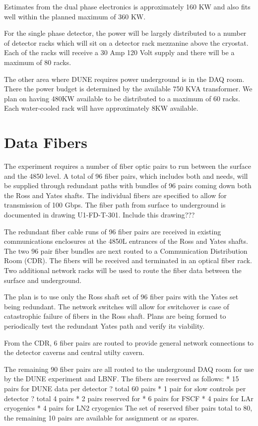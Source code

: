 Estimates from the dual phase electronics is approximately 160 KW and also fits well within the planned maximum of 360 KW.

For the single phase detector, the power will be largely distributed to a number of detector racks which will sit on a detector rack mezzanine above the cryostat.  Each of the racks will receive a 30 Amp 120 Volt supply and there will be a maximum of 80 racks.  

The other area where DUNE requires power underground is in the DAQ room.  There the power budget is determined by the available 750 KVA transformer.  We plan on having 480KW available to be distributed to a maximum of 60 racks.  Each water-cooled rack will have approximately 8KW available.  

\section{Data Fibers}
\label{sec:fdsp-coord-faci-fibers}


The  experiment requires a number of fiber 
optic pairs to run between the surface and the 4850 level.  A
total of 96 fiber pairs, which includes both  and 
needs, will be supplied through redundant paths with bundles of 96 pairs
coming down both the Ross and Yates shafts.  The individual fibers are specified to allow for transmission of 100 Gbps.  The fiber path from surface to underground is documented in drawing U1-FD-T-301.  Include this drawing???

The redundant fiber cable runs of 96 fiber pairs are received in existing communications enclosures at the 4850L entrances of the Ross and Yates shafts.  The two 96 pair fiber bundles are next routed to a Communication Distribution Room (CDR).  The fibers will be received and terminated in an optical fiber rack. Two additional network racks will be used to route the fiber data between the surface and underground.

The plan is to use only the Ross shaft set of 96 fiber pairs with the Yates set being redundant.  The network switches will allow for switchover is case of catastrophic failure of fibers in the Ross shaft.  Plans are being formed to periodically test the redundant Yates path and verify its viability.

From the CDR, 6 fiber pairs are routed to provide general network connections to the detector caverns and central utilty cavern.

The remaining 90 fiber pairs are all routed to the underground DAQ room for use by the DUNE experiment and LBNF. The fibers are reserved as follows:
* 15 pairs for DUNE data per detector ? total 60 pairs
* 1 pair for slow controls per detector ? total 4 pairs
* 2 pairs reserved for 
* 6 pairs for FSCF
* 4 pairs for LAr cryogenics
* 4 pairs for LN2 cryogenics
The set of reserved fiber pairs total to 80, the remaining 10 pairs are available for assignment or as spares.
	

